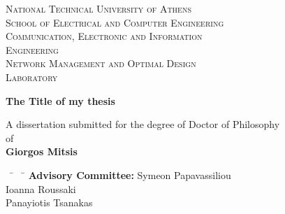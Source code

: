\begin{titlepage}

\begin{minipage}[t]{0.25\textwidth}
  \centering{}
\end{minipage} \hfill
\begin{minipage}[t]{0.75\textwidth}
  \textsc{National Technical University of Athens}\\
  \textsc{School of Electrical and Computer Engineering}\\
  \textsc{Communication, Electronic and Information \\ Engineering}\\
  \textsc{Network Management and Optimal Design \\ Laboratory}
\end{minipage}

\begin{center}
  \vspace{2cm}
  \Large{\textbf{The Title of my thesis}}\\
  \vspace{2cm}
\end{center}

\begin{center}

\normalsize{A dissertation submitted for the degree of Doctor of Philosophy}\\
\vspace{0.2cm}
\normalsize{of}\\
\vspace{0.2cm}
\large{\textbf{Giorgos Mitsis}}\\
\vspace{1.5cm}

\end{center}

\small

\begin{tabbing}
  ~ \hskip 0cm \= ~ \hskip 5.3cm \=\kill %
  \> \textbf{Advisory Committee:} \> Symeon Papavassiliou\\
  \> \> Ioanna Roussaki\\
  \> \> Panayiotis Tsanakas\\%
  \> \> \\


\end{tabbing}
\end{titlepage}
